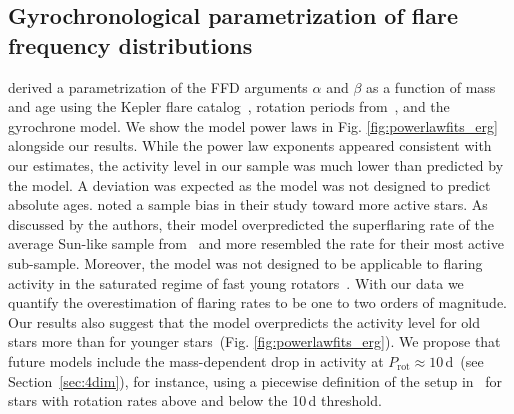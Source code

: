 \documentclass{aa}
\begin{document}
\subsection{Gyrochronological parametrization of flare frequency distributions}
\label{sec:davenport}
\citet{davenport2019} derived a parametrization of the FFD arguments $\alpha$ and $\beta$ as a function of mass and age using the Kepler flare catalog~\citep{davenport_kepler_2016}, rotation periods from~\citet{mcquillan2014}, and the \citet{mamajek2008} gyrochrone model. We show the model power laws in Fig. \ref{fig:powerlawfits_erg} alongside our results. While the power law exponents appeared consistent with our estimates, the activity level in our sample was much lower than predicted by the model. A deviation was expected as the model was not designed to predict absolute ages. \citet{davenport2019} noted a sample bias in their study toward more active stars. As discussed by the authors, their model overpredicted the superflaring rate of the average Sun-like sample from~\citet{shibayama2013} and more resembled the rate for their most active sub-sample. Moreover, the model was not designed to be applicable to flaring activity in the saturated regime of fast young rotators~\citep{jackman2020}. With our data we quantify the overestimation of flaring rates to be one to two orders of magnitude. Our results also suggest that the model overpredicts the activity level for old stars more than for younger stars~(Fig. \ref{fig:powerlawfits_erg}). We propose that future models include the mass-dependent drop in activity at $P_\mathrm{rot}\approx 10\,$d~(see Section~\ref{sec:4dim}), for instance, using a piecewise definition of the setup in~\citet{davenport2019} for stars with rotation rates above and below the 10\,d threshold.
\end{document}
